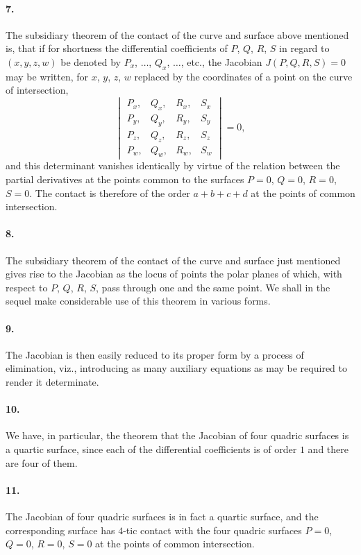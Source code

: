 \documentclass[11pt,a4paper]{article}
\begin{document}
\paragraph{7.}
The subsidiary theorem of the contact of the curve and surface above mentioned is, that
if for shortness the differential coefficients of $P$, $Q$, $R$, $S$ in regard to
$(x, y, z, w)$ be denoted by $P_x$, $\ldots$, $Q_x$, $\ldots$, etc., the Jacobian
$J(P, Q, R, S) = 0$ may be written, for $x$, $y$, $z$, $w$ replaced by the coordinates of
a point on the curve of intersection,
\[
\begin{vmatrix}
P_x, & Q_x, & R_x, & S_x \\
P_y, & Q_y, & R_y, & S_y \\
P_z, & Q_z, & R_z, & S_z \\
P_w, & Q_w, & R_w, & S_w
\end{vmatrix} = 0,
\]
and this determinant vanishes identically by virtue of the relation between
the partial derivatives at the points common to the surfaces $P = 0$, $Q = 0$, $R = 0$,
$S = 0$. The contact is therefore of the order $a + b + c + d$ at the points of common
intersection.

\paragraph{8.}
The subsidiary theorem of the contact of the curve and surface just mentioned gives
rise to the Jacobian as the locus of points the polar planes of which, with respect to
$P$, $Q$, $R$, $S$, pass through one and the same point. We shall in the sequel make
considerable use of this theorem in various forms.

\paragraph{9.}
The Jacobian is then easily reduced to its proper form by a process of elimination, viz.,
introducing as many auxiliary equations as may be required to render it determinate.

\paragraph{10.}
We have, in particular, the theorem that the Jacobian of four quadric surfaces is a
quartic surface, since each of the differential coefficients is of order $1$ and there
are four of them.

\paragraph{11.}
The Jacobian of four quadric surfaces is in fact a quartic surface, and the corresponding
surface has $4$-tic contact with the four quadric surfaces $P = 0$, $Q = 0$, $R = 0$,
$S = 0$ at the points of common intersection.
\end{document}
